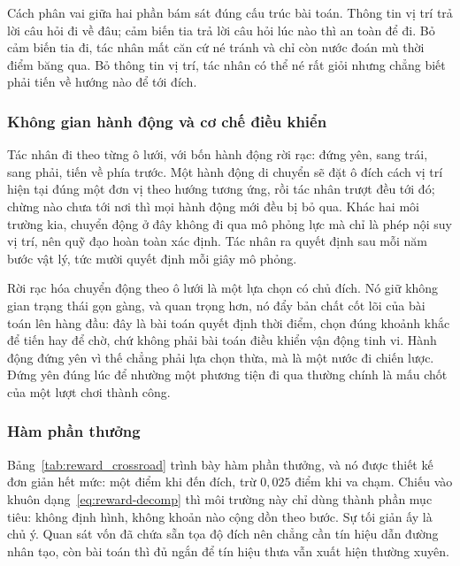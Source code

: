 \indent Cách phân vai giữa hai phần bám sát đúng cấu trúc bài toán. Thông tin vị trí trả
lời câu hỏi đi về đâu; cảm biến tia trả lời câu hỏi lúc nào thì an toàn để đi. Bỏ cảm biến
tia đi, tác nhân mất căn cứ né tránh và chỉ còn nước đoán mù thời điểm băng qua. Bỏ thông
tin vị trí, tác nhân có thể né rất giỏi nhưng chẳng biết phải tiến về hướng nào để tới
đích.

\subsubsection{Không gian hành động và cơ chế điều khiển}
\indent Tác nhân đi theo từng ô lưới, với bốn hành động rời rạc: đứng yên, sang trái, sang
phải, tiến về phía trước. Một hành động di chuyển sẽ đặt ô đích cách vị trí hiện tại đúng
một đơn vị theo hướng tương ứng, rồi tác nhân trượt đều tới đó; chừng nào chưa tới nơi thì
mọi hành động mới đều bị bỏ qua. Khác hai môi trường kia, chuyển động ở đây không đi qua
mô phỏng lực mà chỉ là phép nội suy vị trí, nên quỹ đạo hoàn toàn xác định. Tác nhân ra
quyết định sau mỗi năm bước vật lý, tức mười quyết định mỗi giây mô phỏng.

\indent Rời rạc hóa chuyển động theo ô lưới là một lựa chọn có chủ đích. Nó giữ không gian
trạng thái gọn gàng, và quan trọng hơn, nó đẩy bản chất cốt lõi của bài toán lên hàng đầu:
đây là bài toán quyết định thời điểm, chọn đúng khoảnh khắc để tiến hay để chờ, chứ không phải
bài toán điều khiển vận động tinh vi. Hành động đứng yên vì thế chẳng phải lựa
chọn thừa, mà là một nước đi chiến lược. Đứng yên đúng lúc để nhường một phương tiện đi
qua thường chính là mấu chốt của một lượt chơi thành công.

\subsubsection{Hàm phần thưởng}
\indent Bảng~\ref{tab:reward_crossroad} trình bày hàm phần thưởng, và nó được thiết kế đơn
giản hết mức: một điểm khi đến đích, trừ $0{,}025$ điểm khi va chạm. Chiếu vào khuôn
dạng~\eqref{eq:reward-decomp} thì môi trường này chỉ dùng thành phần mục tiêu: không định
hình, không khoản nào cộng dồn theo bước. Sự tối giản ấy là chủ ý. Quan sát vốn đã chứa
sẵn tọa độ đích nên chẳng cần tín hiệu dẫn đường nhân tạo, còn bài toán thì đủ ngắn để tín
hiệu thưa vẫn xuất hiện thường xuyên.

